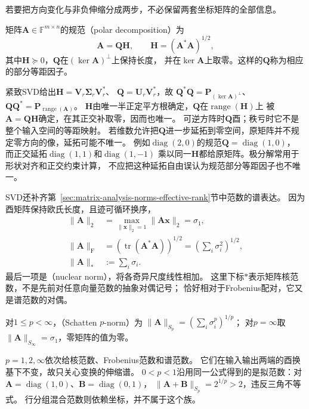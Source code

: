 若要把方向变化与非负伸缩分成两步，不必保留两套坐标矩阵的全部信息。
\begin{definition}[极分解与部分等距因子]
\label{def:matrix-analysis-polar-decomposition}
矩阵$\bm A\in\mathbb F^{m\times n}$的规范（polar decomposition）为
\begin{equation}
 \bm A=\bm Q\bm H,\qquad
 \bm H=(\bm A^*\bm A)^{1/2},
 \label{eq:matrix-analysis-polar-decomposition}
\end{equation}
其中$\bm H\succeq0$，$\bm Q$在$(\ker\bm A)^\perp$上保持长度，
并在$\ker\bm A$上取零。这样的$\bm Q$称为相应的部分等距因子。
\end{definition}
紧致SVD给出$\bm H=\bm V_r\bm\Sigma_r\bm V_r^*$、
$\bm Q=\bm U_r\bm V_r^*$，故
$\bm Q^*\bm Q=\bm P_{(\ker\bm A)^\perp}$、
$\bm Q\bm Q^*=\bm P_{\operatorname{range}(\bm A)}$。
$\bm H$由唯一半正定平方根确定，$\bm Q$在$\operatorname{range}(\bm H)$上
被$\bm A=\bm Q\bm H$确定，在其正交补取零，因而也唯一。
可逆方阵时$\bm Q$酉；秩亏时它不是整个输入空间的等距映射。
若维数允许把$\bm Q$进一步延拓到零空间，原矩阵并不规定零方向的像，延拓可能不唯一。
例如$\operatorname{diag}(2,0)$的规范$\bm Q=\operatorname{diag}(1,0)$，
而正交延拓$\operatorname{diag}(1,1)$和$\operatorname{diag}(1,-1)$
乘以同一$\bm H$都给原矩阵。极分解常用于形状对齐和正交约束计算，
不应把这种延拓自由误认为规范部分等距因子也不唯一。

SVD还补齐第~\ref{sec:matrix-analysis-norms-effective-rank}节中范数的谱表达。
因为酉矩阵保持欧氏长度，且迹可循环换序，
\begin{align}
 \lVert\bm A\rVert_2
 &=\max_{\lVert\bm x\rVert_2=1}\lVert\bm A\bm x\rVert_2=\sigma_1,
 \label{eq:matrix-analysis-spectral-norm}\\
 \lVert\bm A\rVert_{\mathrm F}
 &=\left(\operatorname{tr}(\bm A^*\bm A)\right)^{1/2}
   =\left(\sum_i\sigma_i^2\right)^{1/2},
 \label{eq:matrix-analysis-frobenius-norm}\\
 \lVert\bm A\rVert_*
 &:=\sum_i\sigma_i.
 \label{eq:matrix-analysis-nuclear-norm}
\end{align}
最后一项是（nuclear norm），将各奇异尺度线性相加。
这里下标$*$表示矩阵核范数，不是先前对任意向量范数的抽象对偶记号；
恰好相对于Frobenius配对，它又是谱范数的对偶。

\begin{definition}[Schatten范数]
\label{def:matrix-analysis-schatten-norm}
对$1\leq p<\infty$，（Schatten $p$-norm）为
$\lVert\bm A\rVert_{S_p}=(\sum_i\sigma_i^p)^{1/p}$；
对$p=\infty$取$\lVert\bm A\rVert_{S_\infty}=\sigma_1$，零矩阵的值为零。
\end{definition}
$p=1,2,\infty$依次给核范数、Frobenius范数和谱范数。
它们在输入输出两端的酉换基下不变，故只关心变换的伸缩谱。
$0<p<1$沿用同一公式得到的是拟范数：对
$\bm A=\operatorname{diag}(1,0)$、$\bm B=\operatorname{diag}(0,1)$，
$\lVert\bm A+\bm B\rVert_{S_p}=2^{1/p}>2$，违反三角不等式。
行分组混合范数则依赖坐标，并不属于这个族。

